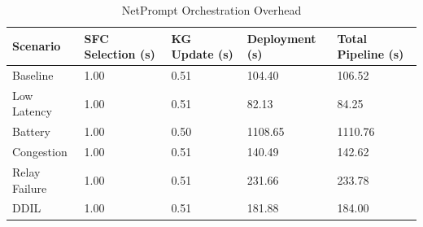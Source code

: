 \begin{table}[t]
\caption{NetPrompt Orchestration Overhead}
\label{tab:overhead}
\centering
\small
\begin{tabular}{lllll}
\toprule
Scenario & SFC Selection (s) & KG Update (s) & Deployment (s) & Total Pipeline (s) \\
\midrule
Baseline & 1.00 & 0.51 & 104.40 & 106.52 \\
Low Latency & 1.00 & 0.51 & 82.13 & 84.25 \\
Battery & 1.00 & 0.50 & 1108.65 & 1110.76 \\
Congestion & 1.00 & 0.51 & 140.49 & 142.62 \\
Relay Failure & 1.00 & 0.51 & 231.66 & 233.78 \\
DDIL & 1.00 & 0.51 & 181.88 & 184.00 \\
\bottomrule
\end{tabular}
\end{table}